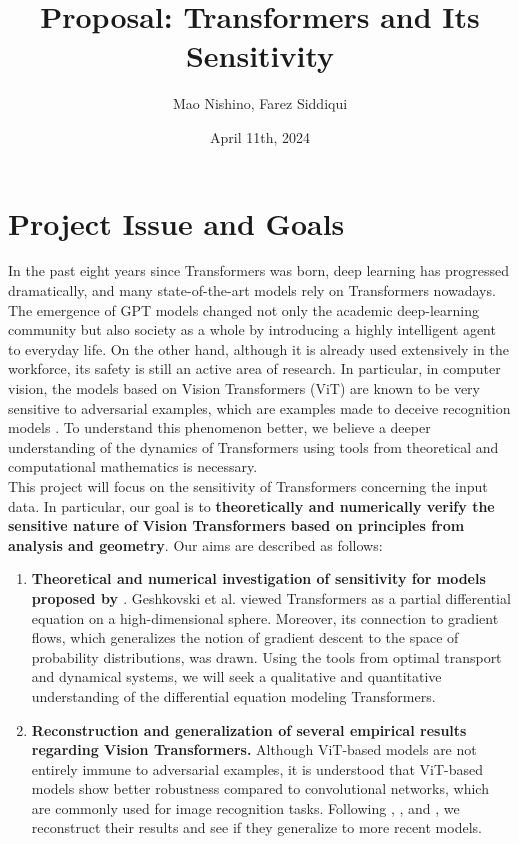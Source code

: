 \documentclass[
	12pt, %
]{../Template/fphw}
\title{Proposal: Transformers and Its Sensitivity} %
\author{Mao Nishino, Farez Siddiqui} %
\date{April 11th, 2024} %
\institute{Florida State University \\ Department of Computer Science} %
\begin{document}
\maketitle %

\section*{Project Issue and Goals} 
In the past eight years since Transformers \cite{att} was born, deep learning has progressed dramatically, and many state-of-the-art models rely on Transformers nowadays. The emergence of GPT models \cite{radford2018improving} changed not only the academic deep-learning community but also society as a whole by introducing a highly intelligent agent to everyday life. On the other hand, although it is already used extensively in the workforce, its safety is still an active area of research. In particular, in computer vision, the models based on Vision Transformers (ViT) are known to be very sensitive to adversarial examples, which are examples made to deceive recognition models \cite{salman2024intriguing}. To understand this phenomenon better, we believe a deeper understanding of the dynamics of Transformers using tools from theoretical and computational mathematics is necessary. \\

This project will focus on the sensitivity of Transformers concerning the input data. In particular, our goal is to \textbf{theoretically and numerically verify the sensitive nature of Vision Transformers based on principles from analysis and geometry}. Our aims are described as follows:

\begin{enumerate}
    \item \textbf{Theoretical and numerical investigation of sensitivity for models proposed by \cite{geshkovski2024mathematical}}. Geshkovski et al. viewed Transformers as a partial differential equation on a high-dimensional sphere. Moreover, its connection to gradient flows, which generalizes the notion of gradient descent to the space of probability distributions, was drawn. Using the tools from optimal transport and dynamical systems, we will seek a qualitative and quantitative understanding of the differential equation modeling Transformers.
    \item \textbf{Reconstruction and generalization of several empirical results regarding Vision Transformers.} Although ViT-based models are not entirely immune to adversarial examples, it is understood that ViT-based models show better robustness compared to convolutional networks, which are commonly used for image recognition tasks. Following \cite{naseer2021intriguing}, \cite{zhou2022understanding}, and \cite{salman2024intriguing}, we reconstruct their results and see if they generalize to more recent models. 

    
\end{enumerate}



\end{document}
